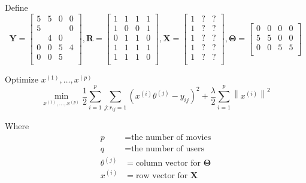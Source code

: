 Define
\begin{equation}
    \mathbf{Y} = \left[\begin{array}{cccc} 5 & 5 & 0 & 0 \\ 5 &   &   & 0 \\   & 4 & 0 &   \\ 0 & 0 & 5 & 4 \\ 0 & 0 & 5 &  \\ \end{array}\right], 
    \mathbf{R} = \left[\begin{array}{cccc} 1 & 1 & 1 & 1 \\ 1 & 0 & 0 & 1 \\ 0 & 1 & 1 & 0 \\ 1 & 1 & 1 & 1 \\ 1 & 1 & 1 & 0 \\ \end{array}\right], 
    \mathbf{X} = \left[\begin{array}{ccc} 1 & ? & ? \\ 1 & ? & ? \\ 1 & ? & ? \\ 1 & ? & ? \\ 1 & ? & ? \\ \end{array}\right],
    \mathbf{\Theta} = \left[\begin{array}{cccc} 0 & 0 & 0 & 0 \\ 5 & 5 & 0 & 0 \\ 0 & 0 & 5 & 5 \\ \end{array}\right]
\end{equation}


Optimize $x^{(1)}, \dots, x^{(p)}$
\begin{equation}
    \min_{x^{(1)}, \dots, x^{(p)}} \frac{1}{2}\sum_{i=1}^{p}\sum_{j:r_{ij}=1}\left(x^{(i)} \theta^{(j)} - y_{ij}\right)^2 + \frac{\lambda}{2}\sum_{i=1}^{p} \left\|x^{(i)}\right\|^2
\end{equation}


Where
\begin{equation}
    \begin{array}{ll}
        p            &= \text{the number of movies}\\
        q            &= \text{the number of users} \\
        \theta^{(j)} &= \text{column vector for $\mathbf{\Theta}$}\\
        x^{(i)}      &= \text{row vector for $\mathbf{X}$}\\
    \end{array}
\end{equation}


